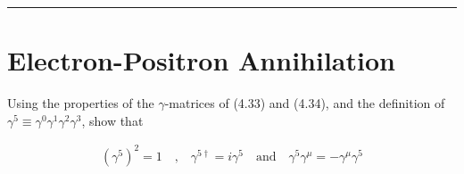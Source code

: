 
\noindent\rule{7in}{2.8pt}
\section{Electron-Positron Annihilation}
    
\begin{problem}{6.1}
Using the properties of the $\gamma$-matrices of (4.33) and (4.34), and the definition of $\gamma^5\equiv\gamma^0\gamma^1\gamma^2\gamma^3$, show that

\begin{align*}
    \left(\gamma^5\right)^2 = 1 \quad \text{,} \quad \gamma^{5\dagger} = i\gamma^5 \quad \text{and} \quad \gamma^5\gamma^\mu = - \gamma^\mu\gamma^5 \\
\end{align*}
\end{problem}

